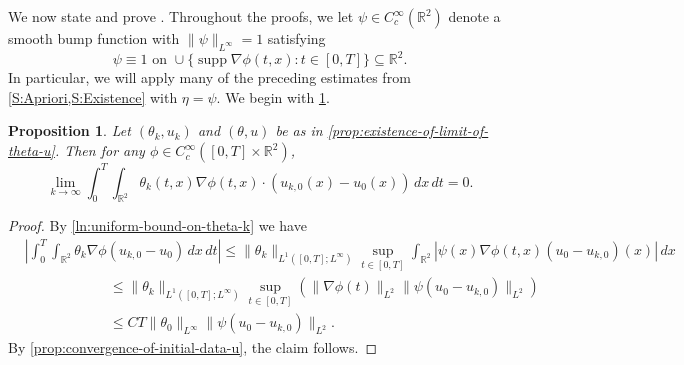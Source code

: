 \documentclass[11pt,reqno,xcolor=svgnames]{amsart}
\def\R{{\mathbb R}}
\theoremstyle{plain}
\newtheorem{prop}[theorem]{Proposition}
\theoremstyle{definition}
\theoremstyle{plain}
\theoremstyle{remark}
\newcommand{\abs}[1]{\left\vert#1\right\vert}
\DeclareMathOperator{\supp}{supp}
\begin{document}
We now state and prove .  Throughout the proofs, we let $\psi\in C^{\infty}_c(\R^2)$ denote a smooth bump function with $\|\psi \|_{L^{\infty}} = 1$ satisfying 
$$\psi \equiv 1 \text{ on } \cup\{ \supp \nabla \phi(t,x): t\in [0,T]\}\subseteq\R^2. $$  In particular, we will apply many of the preceding estimates from \cref{S:Apriori,S:Existence} with $\eta = \psi$.  We begin with \cref{prop:initial-data-convergence}.
\begin{prop}\label{prop:initial-data-convergence}
Let $(\theta_k, u_k)$ and $(\theta,u)$ be as in \cref{prop:existence-of-limit-of-theta-u}.  Then for any $\phi\in C^{\infty}_c([0,T]\times \R^2)$,
\begin{equation}
    \lim_{k\to \infty} \int_0^T\int_{\R^2} \theta_k(t,x) \nabla \phi(t,x)\cdot (u_{k,0}(x) - u_0(x))\, dx \, dt=  0. 
\end{equation}
\end{prop}
\begin{proof}
      By \cref{ln:uniform-bound-on-theta-k} we have
    \begin{equation}
    \begin{split}
        &\abs{\int_0^T\int_{\R^2} \theta_k \nabla \phi (u_{k,0}- u_0) \, dx \, dt} \leq \|\theta_k \|_{L^1([0,T];L^\infty)} \sup_{t\in [0,T]}\int_{\R^2} |\psi(x) \nabla \phi(t,x)( u_0-u_{k,0})(x)| \, dx \\
        &\qquad \qquad\qquad\leq \|\theta_k \|_{L^1([0,T];L^\infty)} \sup_{t\in [0,T]}(\|\nabla \phi(t)\|_{L^2} \|\psi( u_0-u_{k,0})\|_{L^2} ) \\
        &\qquad \qquad\qquad\leq CT\|\theta_0 \|_{L^\infty} \|\psi( u_0-u_{k,0})\|_{L^2}. 
    \end{split}
    \end{equation}
    By \cref{prop:convergence-of-initial-data-u}, the claim follows.
\end{proof}
\end{document}
